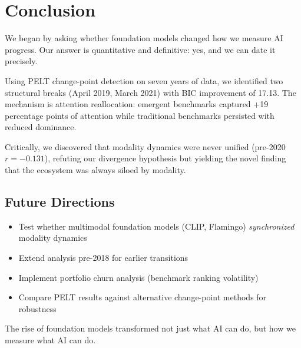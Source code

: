 \section{Conclusion}

We began by asking whether foundation models changed how we measure AI progress. Our answer is quantitative and definitive: yes, and we can date it precisely.

Using PELT change-point detection on seven years of data, we identified two structural breaks (April 2019, March 2021) with BIC improvement of 17.13. The mechanism is attention reallocation: emergent benchmarks captured +19 percentage points of attention while traditional benchmarks persisted with reduced dominance.

Critically, we discovered that modality dynamics were never unified (pre-2020 $r = -0.131$), refuting our divergence hypothesis but yielding the novel finding that the ecosystem was always siloed by modality.

\subsection{Future Directions}

\begin{itemize}
    \item Test whether multimodal foundation models (CLIP, Flamingo) \emph{synchronized} modality dynamics
    \item Extend analysis pre-2018 for earlier transitions
    \item Implement portfolio churn analysis (benchmark ranking volatility)
    \item Compare PELT results against alternative change-point methods for robustness
\end{itemize}

The rise of foundation models transformed not just what AI can do, but how we measure what AI can do.

